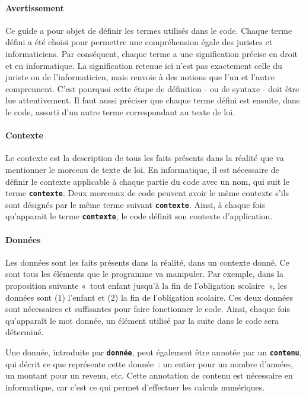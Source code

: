 \documentclass[12pt, french]{article}
\newcommand{\kw}[1]{\textbf{\textcolor{OliveGreen}{#1}}}
\newcommand{\inlinekw}[1]{\kw{\texttt{#1}}}
\begin{document}
\paragraph{Avertissement} Ce guide a pour objet de définir les termes utilisés dans le code. Chaque terme défini a été choisi pour permettre une compréhension égale des juristes et informaticiens. Par conséquent, chaque terme a une signification précise en droit et en informatique. La signification retenue ici n’est pas exactement celle du juriste ou de l’informaticien, mais renvoie à des notions que l’un et l’autre comprennent. C’est pourquoi cette étape de définition - ou de syntaxe - doit être lue attentivement. Il faut aussi préciser que chaque terme défini est ensuite, dans le code, assorti d’un autre terme correspondant au texte de loi.

\paragraph{Contexte} Le contexte est la description de tous les faits présents dans la réalité que va mentionner le morceau de texte de loi. En informatique, il est nécessaire de définir le contexte applicable à chaque partie du code avec un nom, qui suit le terme \inlinekw{contexte}. Deux morceaux de code peuvent avoir le même contexte s’ils sont désignés par le même terme suivant \inlinekw{contexte}. Ainsi, à chaque fois qu’apparait le terme \inlinekw{contexte}, le code définit son contexte d’application.

\paragraph{Données} Les données sont les faits présents dans la réalité, dans un contexte donné. Ce sont tous les éléments que le programme va manipuler. Par exemple, dans la proposition suivante « tout enfant jusqu’à la fin de l’obligation scolaire », les données sont (1) l'enfant  et (2) la fin de l’obligation scolaire. Ces deux données sont nécessaires et suffisantes pour faire fonctionner le code. Ainsi, chaque fois qu’apparaît le mot donnée, un élément utilisé par la suite dans le code sera déterminé.

Une donnée, introduite par \inlinekw{donnée}, peut également être annotée par un \inlinekw{contenu}, qui décrit ce que représente cette donnée : un entier pour un nombre d’années, un montant pour un revenu, etc. Cette annotation de contenu est nécessaire en informatique, car c’est ce qui permet d’effectuer les calculs numériques.
\end{document}

